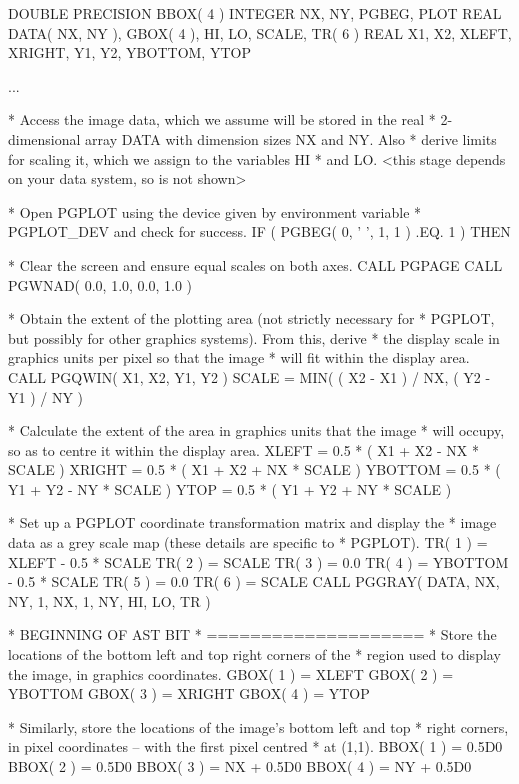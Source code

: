 \documentclass[twoside,11pt]{starlink}
\begin{document}
\begin{terminalv}
      DOUBLE PRECISION BBOX( 4 )
      INTEGER NX, NY, PGBEG, PLOT
      REAL DATA( NX, NY ), GBOX( 4 ), HI, LO, SCALE, TR( 6 )
      REAL X1, X2, XLEFT, XRIGHT, Y1, Y2, YBOTTOM, YTOP

      ...

*  Access the image data, which we assume will be stored in the real
*  2-dimensional array DATA with dimension sizes NX and NY. Also
*  derive limits for scaling it, which we assign to the variables HI
*  and LO.
      <this stage depends on your data system, so is not shown>

*  Open PGPLOT using the device given by environment variable
*  PGPLOT_DEV and check for success.
      IF ( PGBEG( 0, ' ', 1, 1 ) .EQ. 1 ) THEN

*  Clear the screen and ensure equal scales on both axes.
         CALL PGPAGE
         CALL PGWNAD( 0.0, 1.0, 0.0, 1.0 )

*  Obtain the extent of the plotting area (not strictly necessary for
*  PGPLOT, but possibly for other graphics systems). From this, derive
*  the display scale in graphics units per pixel so that the image
*  will fit within the display area.
         CALL PGQWIN( X1, X2, Y1, Y2 )
         SCALE = MIN( ( X2 - X1 ) / NX, ( Y2 - Y1 ) / NY )

*  Calculate the extent of the area in graphics units that the image
*  will occupy, so as to centre it within the display area.
         XLEFT   = 0.5 * ( X1 + X2 - NX * SCALE )
         XRIGHT  = 0.5 * ( X1 + X2 + NX * SCALE )
         YBOTTOM = 0.5 * ( Y1 + Y2 - NY * SCALE )
         YTOP    = 0.5 * ( Y1 + Y2 + NY * SCALE )

*  Set up a PGPLOT coordinate transformation matrix and display the
*  image data as a grey scale map (these details are specific to
*  PGPLOT).
         TR( 1 ) = XLEFT - 0.5 * SCALE
         TR( 2 ) = SCALE
         TR( 3 ) = 0.0
         TR( 4 ) = YBOTTOM - 0.5 * SCALE
         TR( 5 ) = 0.0
         TR( 6 ) = SCALE
         CALL PGGRAY( DATA, NX, NY, 1, NX, 1, NY, HI, LO, TR )

*  BEGINNING OF AST BIT
*  ====================
*  Store the locations of the bottom left and top right corners of the
*  region used to display the image, in graphics coordinates.
         GBOX( 1 ) = XLEFT
         GBOX( 2 ) = YBOTTOM
         GBOX( 3 ) = XRIGHT
         GBOX( 4 ) = YTOP

*  Similarly, store the locations of the image's bottom left and top
*  right corners, in pixel coordinates -- with the first pixel centred
*  at (1,1).
         BBOX( 1 ) = 0.5D0
         BBOX( 2 ) = 0.5D0
         BBOX( 3 ) = NX + 0.5D0
         BBOX( 4 ) = NY + 0.5D0


\end{terminalv}
\end{document}
